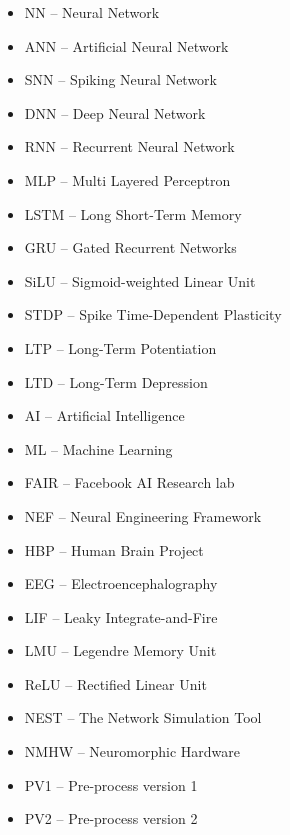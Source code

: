 \begin{itemize}
	\item NN -- Neural Network
	\item ANN -- Artificial Neural Network
	\item SNN -- Spiking Neural Network
	\item DNN -- Deep Neural Network
	\item RNN -- Recurrent Neural Network
	\item MLP -- Multi Layered Perceptron
	\item LSTM -- Long Short-Term Memory
	\item GRU -- Gated Recurrent Networks
	\item SiLU -- Sigmoid-weighted Linear Unit
	\item STDP -- Spike Time-Dependent Plasticity
	\item LTP -- Long-Term Potentiation
	\item LTD -- Long-Term Depression
	\item AI -- Artificial Intelligence
	\item ML -- Machine Learning
	\item FAIR -- Facebook AI Research lab
	\item NEF -- Neural Engineering Framework
	\item HBP -- Human Brain Project
	\item EEG -- Electroencephalography
	\item LIF -- Leaky Integrate-and-Fire
	\item LMU -- Legendre Memory Unit
	\item ReLU -- Rectified Linear Unit
	\item NEST -- The Network Simulation Tool
	\item NMHW -- Neuromorphic Hardware
	\item PV1 -- Pre-process version 1
	\item PV2 -- Pre-process version 2
\end{itemize}
